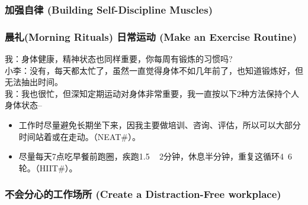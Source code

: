 

\hypertarget{ux6839ux56e0ux5206ux6790ux8befux89e3ux6848ux4f8b}{%
\subsubsection{加强自律 (Building Self-Discipline Muscles)}\label{ux6839ux56e0ux5206ux6790ux8befux89e3ux6848ux4f8b}}


\hypertarget{ux6839ux56e0ux5206ux6790ux8befux89e3ux6848ux4f8b}{%
\subsubsection{晨礼(Morning Rituals) 日常运动 (Make an Exercise Routine)}\label{ux6839ux56e0ux5206ux6790ux8befux89e3ux6848ux4f8b}}



我：身体健康，精神状态也同样重要，你每周有锻炼的习惯吗?\\
小李：没有，每天都太忙了，虽然一直觉得身体不如几年前了，也知道锻炼好，但无法抽出时间。\\
我：我也很忙，但深知定期运动对身体非常重要，我一直按以下2种方法保持个人身体状态--

\begin{itemize}
\tightlist
\item
  工作时尽量避免长期坐下来，因我主要做培训、咨询、评估，所以可以大部分时间站着或在走动。（NEAT\#）。
\item
  尽量每天7点吃早餐前跑圈，疾跑1.5 ~ 
  2分钟，休息半分钟，重复这循环4~6轮。（HIIT\#）。
\end{itemize}

\hypertarget{ux6839ux56e0ux5206ux6790ux8befux89e3ux6848ux4f8b}{%
\subsubsection{不会分心的工作场所 (Create a Distraction-Free workplace)}\label{ux6839ux56e0ux5206ux6790ux8befux89e3ux6848ux4f8b}}


